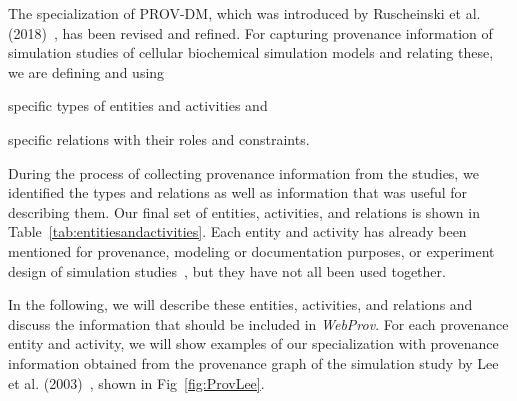 \documentclass[10pt,letterpaper]{article}
\newcommand{\webprov}{\textit{WebProv}}
\newcommand{\lee}{Lee et al. (2003)}
\begin{document}
The specialization of PROV-DM, which was introduced by Ruscheinski et al. (2018)~\cite{Ruscheinski2018}, has been revised and refined.
For capturing provenance information of simulation studies of cellular biochemical simulation models and relating these, we are defining and using
\begin{inparaenum}[a)]
\item specific types of entities and activities and
\item specific relations with their roles and constraints.
\end{inparaenum}
During the process of collecting provenance information from the studies, we identified the types and relations as well as information that was useful for describing them.
Our final set of entities, activities, and relations is shown in Table~\ref{tab:entitiesandactivities}.
Each entity and activity has already been mentioned for provenance, modeling or documentation purposes, or experiment design of simulation studies~\cite{Ruscheinski2017, Balci2012, Yilmaz2016, Monks2018, Bergmann2014, Carusi2012, Erdemir2012, Lorig2017, Ruscheinski2018, Waltemath2011, Wilsdorf2020b}, but they have not all been used together.

In the following, we will describe these entities, activities, and relations and discuss the information that should be included in \webprov{}.
For each provenance entity and activity, we will show examples of our specialization with provenance information obtained from the provenance graph of the simulation study by \lee{}~\cite{Lee2003}, shown in Fig~\ref{fig:ProvLee}.
\end{document}
